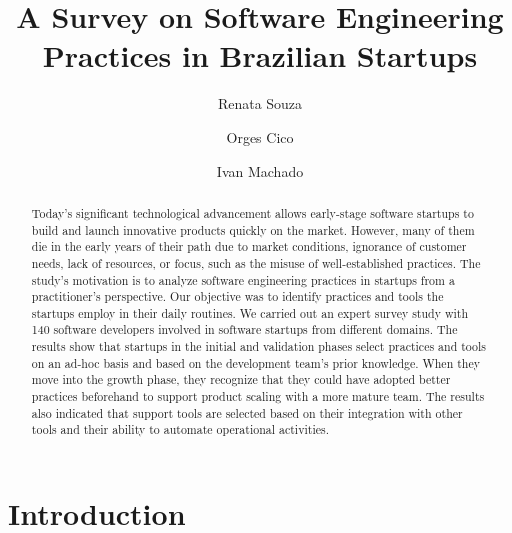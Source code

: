 \documentclass[runningheads]{llncs}
\begin{document}
\title{A Survey on Software Engineering Practices in Brazilian Startups}

\author{Renata Souza \and
Orges Cico \and
Ivan Machado}



\maketitle              

\begin{abstract}
Today's significant technological advancement allows early-stage software startups to build and launch innovative products quickly on the market. However, many of them die in the early years of their path due to market conditions, ignorance of customer needs, lack of resources, or focus, such as the misuse of well-established practices. The study's motivation is to analyze software engineering practices in startups from a practitioner's perspective. Our objective was to identify practices and tools the startups employ in their daily routines. We carried out an expert survey study with 140 software developers involved in software startups from different domains. The results show that startups in the initial and validation phases select practices and tools on an ad-hoc basis and based on the development team's prior knowledge. When they move into the growth phase, they recognize that they could have adopted better practices beforehand to support product scaling with a more mature team. The results also indicated that support tools are selected based on their integration with other tools and their ability to automate operational activities.

\end{abstract}


\section{Introduction} 
\label{section:introduction}
\end{document}
